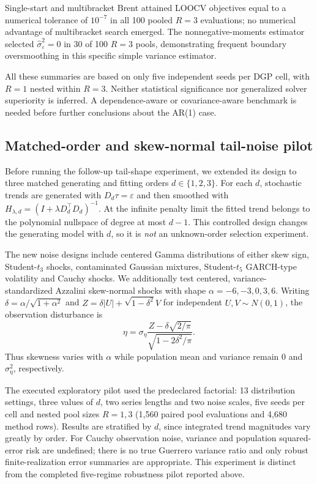 \documentclass[11pt]{article}
\begin{document}
Single-start and multibracket Brent attained LOOCV objectives
equal to a numerical tolerance of $10^{-7}$ in all 100 pooled
$R=3$ evaluations; no numerical advantage of multibracket
search emerged. The nonnegative-moments estimator selected
$\widehat\sigma_\varepsilon^2=0$ in 30 of 100 $R=3$ pools,
demonstrating frequent boundary oversmoothing in this
specific simple variance estimator.

All these summaries are based on only five independent seeds
per DGP cell, with $R=1$ nested within $R=3$. Neither
statistical significance nor generalized solver superiority
is inferred. A dependence-aware or covariance-aware benchmark
is needed before further conclusions about the AR(1) case.

\subsection{Matched-order and skew-normal tail-noise pilot}

Before running the follow-up tail-shape experiment, we extended its
design to three matched generating and fitting orders
$d\in\{1,2,3\}$. For each $d$, stochastic trends are generated
with $D_d\tau=\varepsilon$ and then smoothed with
$H_{\lambda,d}=(I+\lambda D_d^\top D_d)^{-1}$. At the infinite
penalty limit the fitted trend belongs to the polynomial
nullspace of degree at most $d-1$. This controlled design changes
the generating model with $d$, so it is \emph{not} an
unknown-order selection experiment.

The new noise designs include centered Gamma distributions of
either skew sign, Student-$t_3$ shocks, contaminated Gaussian
mixtures, Student-$t_5$ GARCH-type volatility and Cauchy shocks.
We additionally test centered, variance-standardized Azzalini
skew-normal shocks with shape $\alpha=-6,-3,0,3,6$.
Writing $\delta=\alpha/\sqrt{1+\alpha^2}$ and
$Z=\delta|U|+\sqrt{1-\delta^2}V$ for independent
$U,V\sim N(0,1)$, the observation disturbance is
\[
 \eta=\sigma_\eta
 \frac{Z-\delta\sqrt{2/\pi}}{\sqrt{1-2\delta^2/\pi}}.
\]
Thus skewness varies with $\alpha$ while population mean and
variance remain $0$ and $\sigma_\eta^2$, respectively.

The executed exploratory pilot used the predeclared factorial:
13 distribution settings, three values of $d$, two series lengths
and two noise scales, five seeds per cell and nested pool sizes
$R=1,3$ (1,560 paired pool evaluations and 4,680 method rows).
Results are stratified by $d$, since integrated trend
magnitudes vary greatly by order. For Cauchy observation noise,
variance and population squared-error risk are undefined;
there is no true Guerrero variance ratio and only robust
finite-realization error summaries are appropriate.
This experiment is distinct from the completed five-regime
robustness pilot reported above.
\end{document}
